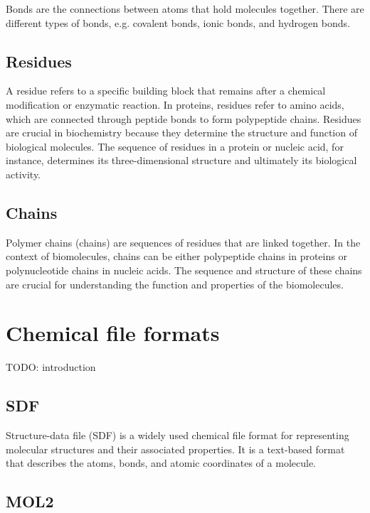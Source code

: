 \documentclass[
  digital,     %
  oneside,     %
  nosansbold,  %
  nocolorbold, %
  lof,         %
  lot,         %
]{fithesis4}
\begin{document}
Bonds are the connections between atoms that hold molecules together. There are different types of bonds, e.g. covalent bonds, ionic bonds, and hydrogen bonds.

\subsection{Residues}
\label{subsection:residues}

A residue refers to a specific building block that remains after a chemical modification or enzymatic reaction.
In proteins, residues refer to amino acids, which are connected through peptide bonds to form polypeptide chains.
Residues are crucial in biochemistry because they determine the structure and function of biological molecules.
The sequence of residues in a protein or nucleic acid, for instance, determines its three-dimensional structure and ultimately its biological activity.

\subsection{Chains}
\label{subsection:chains}

Polymer chains (chains) are sequences of residues that are linked together. In the context of biomolecules, chains can be either polypeptide chains in proteins or polynucleotide chains in nucleic acids. The sequence and structure of these chains are crucial for understanding the function and properties of the biomolecules.

\section{Chemical file formats}
\label{section:chemical_file_formats}

TODO: introduction

\subsection{SDF}
\label{subsection:sdf}

Structure-data file (SDF) is a widely used chemical file format for representing molecular structures and their associated properties. It is a text-based format that describes the atoms, bonds, and atomic coordinates of a molecule. 

\subsection{MOL2}
\label{subsection:mol2}
\end{document}
